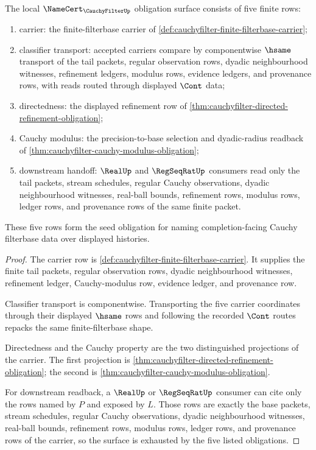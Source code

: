 \begin{theorem}
\label{thm:cauchyfilter-namecert-obligation-surface}
The local $\NameCert_{\CauchyFilterUp}$ obligation surface consists of five
finite rows:
\begin{enumerate}
\item carrier: the finite-filterbase carrier of
\autoref{def:cauchyfilter-finite-filterbase-carrier};
\item classifier transport: accepted carriers compare by componentwise
$\hsame$ transport of the tail packets, regular observation rows, dyadic
neighbourhood witnesses, refinement ledgers, modulus rows, evidence ledgers,
and provenance rows, with reads routed through displayed $\Cont$ data;
\item directedness: the displayed refinement row of
\autoref{thm:cauchyfilter-directed-refinement-obligation};
\item Cauchy modulus: the precision-to-base selection and dyadic-radius
readback of \autoref{thm:cauchyfilter-cauchy-modulus-obligation};
\item downstream handoff: $\RealUp$ and $\RegSeqRatUp$ consumers read only the
tail packets, stream schedules, regular Cauchy observations, dyadic
neighbourhood witnesses, real-ball bounds, refinement rows, modulus rows,
ledger rows, and provenance rows of the same finite packet.
\end{enumerate}
These five rows form the seed obligation for naming completion-facing Cauchy
filterbase data over displayed histories.
\end{theorem}
\begin{proof}
The carrier row is
\autoref{def:cauchyfilter-finite-filterbase-carrier}. It supplies the finite
tail packets, regular observation rows, dyadic neighbourhood witnesses,
refinement ledger, Cauchy-modulus row, evidence ledger, and provenance row.

Classifier transport is componentwise. Transporting the five carrier
coordinates through their displayed $\hsame$ rows and following the recorded
$\Cont$ routes repacks the same finite-filterbase shape.

Directedness and the Cauchy property are the two distinguished projections of
the carrier. The first projection is
\autoref{thm:cauchyfilter-directed-refinement-obligation}; the second is
\autoref{thm:cauchyfilter-cauchy-modulus-obligation}.

For downstream readback, a $\RealUp$ or $\RegSeqRatUp$ consumer can cite only
the rows named by $P$ and exposed by $L$. Those rows are exactly the base
packets, stream schedules, regular Cauchy observations, dyadic neighbourhood
witnesses, real-ball bounds, refinement rows, modulus rows, ledger rows, and
provenance rows of the carrier, so the surface is exhausted by the five listed
obligations.
\end{proof}

